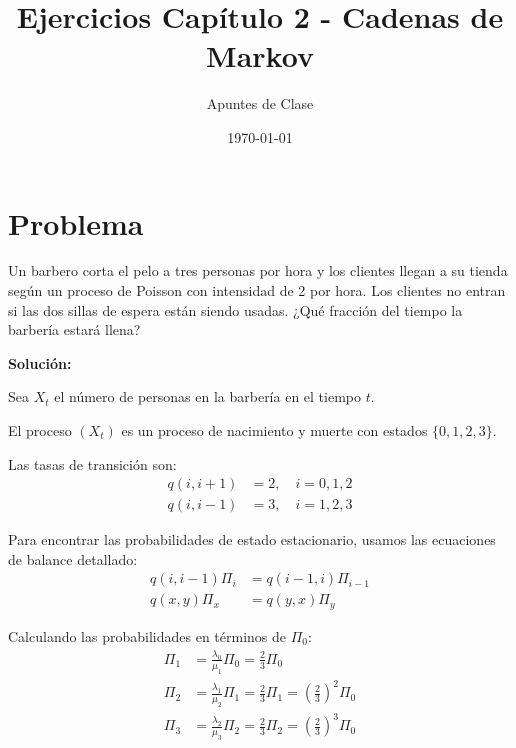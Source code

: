 \documentclass{article}
\title{Ejercicios Capítulo 2 - Cadenas de Markov}
\author{Apuntes de Clase}
\date{\today}
\begin{document}
\maketitle

\section{Problema}

Un barbero corta el pelo a tres personas por hora y los clientes llegan a su tienda según un proceso de Poisson con intensidad de 2 por hora.  
Los clientes no entran si las dos sillas de espera están siendo usadas.  
¿Qué fracción del tiempo la barbería estará llena?

\textbf{Solución:} 

Sea $X_t$ el número de personas en la barbería en el tiempo $t$.

\begin{center}
\end{center}

El proceso $(X_t)$ es un proceso de nacimiento y muerte con estados $\{0, 1, 2, 3\}$.

Las tasas de transición son:
\begin{align*}
q(i, i+1) &= 2, \quad i = 0, 1, 2 \\
q(i, i-1) &= 3, \quad i = 1, 2, 3
\end{align*}

Para encontrar las probabilidades de estado estacionario, usamos las ecuaciones de balance detallado:
\begin{align*}
q(i, i-1) \Pi_i &= q(i-1, i) \Pi_{i-1} \\
q(x, y) \Pi_x &= q(y, x) \Pi_y
\end{align*}

Calculando las probabilidades en términos de $\Pi_0$:
\begin{align*}
\Pi_1 &= \frac{\lambda_0}{\mu_1} \Pi_0 = \frac{2}{3} \Pi_0 \\
\Pi_2 &= \frac{\lambda_1}{\mu_2} \Pi_1 = \frac{2}{3} \Pi_1 = \left(\frac{2}{3}\right)^2 \Pi_0 \\
\Pi_3 &= \frac{\lambda_2}{\mu_3} \Pi_2 = \frac{2}{3} \Pi_2 = \left(\frac{2}{3}\right)^3 \Pi_0
\end{align*}
\end{document}
